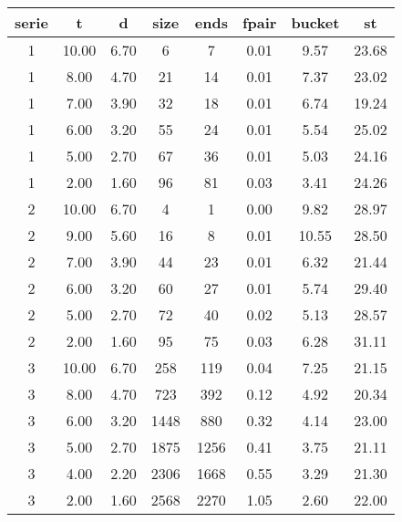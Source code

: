 \begin{tabular}{|c|c|c|c|c|c|c|c|}
\hline
\textbf{serie} & \textbf{t} & \textbf{d} & \textbf{size} & \textbf{ends} & \textbf{fpair} & \textbf{bucket} & \textbf{st}\\
\hline
1 & 10.00 & 6.70 & 6 & 7 & 0.01 & 9.57 & 23.68\\
\hline
1 & 8.00 & 4.70 & 21 & 14 & 0.01 & 7.37 & 23.02\\
\hline
1 & 7.00 & 3.90 & 32 & 18 & 0.01 & 6.74 & 19.24\\
\hline
1 & 6.00 & 3.20 & 55 & 24 & 0.01 & 5.54 & 25.02\\
\hline
1 & 5.00 & 2.70 & 67 & 36 & 0.01 & 5.03 & 24.16\\
\hline
1 & 2.00 & 1.60 & 96 & 81 & 0.03 & 3.41 & 24.26\\
\hline

2 & 10.00 & 6.70 & 4 & 1 & 0.00 & 9.82 & 28.97\\
\hline
2 & 9.00 & 5.60 & 16 & 8 & 0.01 & 10.55 & 28.50\\
\hline
2 & 7.00 & 3.90 & 44 & 23 & 0.01 & 6.32 & 21.44\\
\hline
2 & 6.00 & 3.20 & 60 & 27 & 0.01 & 5.74 & 29.40\\
\hline
2 & 5.00 & 2.70 & 72 & 40 & 0.02 & 5.13 & 28.57\\
\hline
2 & 2.00 & 1.60 & 95 & 75 & 0.03 & 6.28 & 31.11\\
\hline

3 & 10.00 & 6.70 & 258 & 119 & 0.04 & 7.25 & 21.15\\
\hline
3 & 8.00 & 4.70 & 723 & 392 & 0.12 & 4.92 & 20.34\\
\hline
3 & 6.00 & 3.20 & 1448 & 880 & 0.32 & 4.14 & 23.00\\
\hline
3 & 5.00 & 2.70 & 1875 & 1256 & 0.41 & 3.75 & 21.11\\
\hline
3 & 4.00 & 2.20 & 2306 & 1668 & 0.55 & 3.29 & 21.30\\
\hline
3 & 2.00 & 1.60 & 2568 & 2270 & 1.05 & 2.60 & 22.00\\
\hline
\end{tabular}
